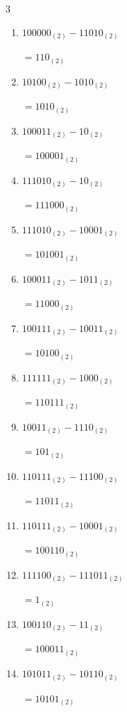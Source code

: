 \begin{multicols}{3}
\begin{enumerate}
  \item $100000_{(2)} - 11010_{(2)}$

        $=110_{(2)}$

  \item $10100_{(2)} - 1010_{(2)}$

        $=1010_{(2)}$

\columnbreak %

  \item $100011_{(2)} - 10_{(2)}$

        $=100001_{(2)}$

  \item $111010_{(2)} - 10_{(2)}$

        $=111000_{(2)}$

  \item $111010_{(2)} - 10001_{(2)}$

        $=101001_{(2)}$

  \item $100011_{(2)} - 1011_{(2)}$

        $=11000_{(2)}$

  \item $100111_{(2)} - 10011_{(2)}$

        $=10100_{(2)}$

  \item $111111_{(2)} - 1000_{(2)}$

        $=110111_{(2)}$

  \item $10011_{(2)} - 1110_{(2)}$

        $=101_{(2)}$

  \item $110111_{(2)} - 11100_{(2)}$

        $=11011_{(2)}$

  \item $110111_{(2)} - 10001_{(2)}$

        $=100110_{(2)}$

  \item $111100_{(2)} - 111011_{(2)}$

        $=1_{(2)}$

\columnbreak %

  \item $100110_{(2)} - 11_{(2)}$

        $=100011_{(2)}$

  \item $101011_{(2)} - 10110_{(2)}$

        $=10101_{(2)}$


\end{enumerate}
\end{multicols}
